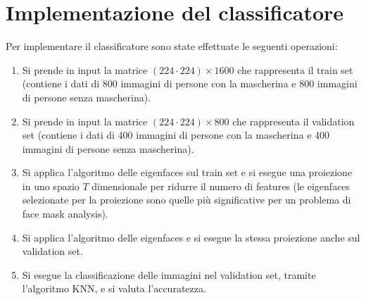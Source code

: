 \documentclass[12pt]{article}
\begin{document}
\newpage
\section{Implementazione del classificatore}
Per implementare il classificatore sono state effettuate le seguenti operazioni:
\begin{enumerate}
    \item Si prende in input la matrice $(224 \cdot 224) \times 1600$ che rappresenta il train set (contiene i dati di 800 immagini di persone con la mascherina e 800 immagini di persone senza mascherina).
    \item Si prende in input la matrice $(224 \cdot 224) \times 800$ che rappresenta il validation set (contiene i dati di 400 immagini di persone con la mascherina e 400 immagini di persone senza mascherina).
    \item Si applica l'algoritmo delle eigenfaces sul train set e si esegue una proiezione in uno spazio $T$ dimensionale per ridurre il numero di features (le eigenfaces selezionate per la proiezione sono quelle più significative per un problema di face mask analysis).
    \item Si applica l'algoritmo delle eigenfaces e si esegue la stessa proiezione anche sul validation set.
    \item Si esegue la classificazione delle immagini nel validation set, tramite l'algoritmo KNN, e si valuta l'accuratezza.
\end{enumerate}

\newpage
\end{document}
